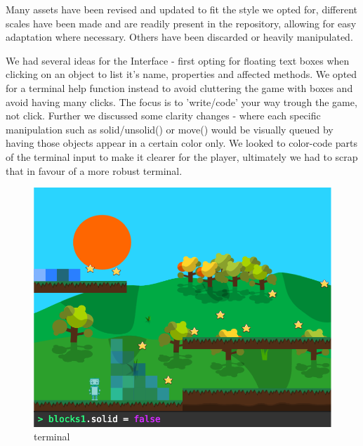 \documentclass[a4paper,twoside,12pt]{article}
\begin{document}
Many assets have been revised and updated to fit the style we opted for, different scales have been made and are readily present in the repository, allowing for easy adaptation where necessary. Others have been discarded or heavily manipulated.

We had several ideas for the Interface - first opting for floating text boxes when clicking on an object to list it's name, properties and affected methods. We opted for a terminal help function instead to avoid cluttering the game with boxes and avoid having many clicks. The focus is to 'write/code' your way trough the game, not click. Further we discussed some clarity changes - where each specific manipulation such as solid/unsolid() or move() would be visually queued by having those objects appear in a certain color only. %
We looked to color-code parts of the terminal input to make it clearer for the player, ultimately we had to scrap that in favour of a more robust terminal. 
\begin{figure}[h]
\includegraphics[scale=0.6]{terminal_example.png} 
\caption{terminal}
\end{figure}
\end{document}
